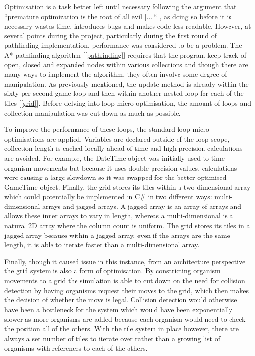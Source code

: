 \documentclass[a4paper, oneside, 11pt]{report}
\begin{document}
Optimisation is a task better left until necessary following the argument that ``premature optimization is the root of all evil [...]`` \cite{knuth}, as doing so before it is necessary wastes time, introduces bugs and makes code less readable. However, at several points during the project, particularly during the first round of pathfinding implementation, performance was considered to be a problem. The A* pathfinding algorithm [\ref{pathfinding}] requires that the program keep track of open, closed and expanded nodes within various collections and though there are many ways to implement the algorithm, they often involve some degree of manipulation. As previously mentioned, the update method is already within the sixty per second game loop and then within another nested loop for each of the tiles [\ref{grid}]. Before delving into loop micro-optimisation, the amount of loops and collection manipulation was cut down as much as possible.

To improve the performance of these loops, the standard loop micro-optimisations are applied. Variables are declared outside of the loop scope, collection length is cached locally ahead of time and high precision calculations are avoided. For example, the DateTime object was initially used to time organism movements but because it uses double precision values, calculations were causing a large slowdown so it was swapped for the better optimised GameTime object. Finally, the grid stores its tiles within a two dimensional array which could potentially be implemented in C\# in two different ways: multi-dimensional arrays and jagged arrays. A jagged array is an array of arrays and allows these inner arrays to vary in length, whereas a multi-dimensional is a natural 2D array where the column count is uniform. The grid stores its tiles in a jagged array because within a jagged array, even if the arrays are the same length, it is able to iterate faster than a multi-dimensional array.

Finally, though it caused issue in this instance, from an architecture perspective the grid system is also a form of optimisation. By constricting organism movements to a grid the simulation is able to cut down on the need for collision detection by having organisms request their moves to the grid, which then makes the decision of whether the move is legal. Collision detection would otherwise have been a bottleneck for the system which would have been exponentially slower as more organisms are added because each organism would need to check the position all of the others. With the tile system in place however, there are always a set number of tiles to iterate over rather than a growing list of organisms with references to each of the others.
\end{document}
